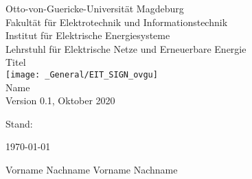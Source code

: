 %
\begin{titlepage}
    \begin{center}
        \normalsize
        Otto-von-Guericke-Universität Magdeburg \\
        Fakultät für Elektrotechnik und Informationstechnik \\
        Institut für Elektrische Energiesysteme \\
        Lehrstuhl für Elektrische Netze und Erneuerbare Energie \\
        \vspace{1cm} %
        \huge
        Titel \\
        \vspace{1.5cm} %
        \texttt{[image: \_General/EIT\_SIGN\_ovgu]} \\
        \vspace{1cm} %
        \Large
        Name  \\
        \vspace{1cm} %
        \tiny Version 0.1, Oktober 2020     
    \end{center}    
    \normalsize
    \vfill %
    \begin{labeling}{Stand: }
        \item[Stand:] \tabto{1cm} \today
        \item
        \item[Autor(en):] \tabto{1cm} Vorname Nachname
                          \tabto{1cm} Vorname Nachname
    \end{labeling}
\end{titlepage}
